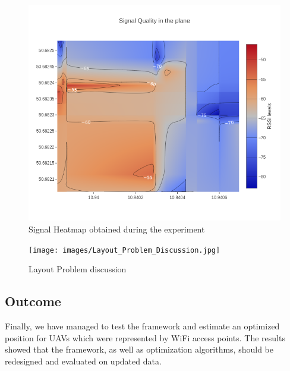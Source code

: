 \begin{figure}[H]
	\centering
	\includegraphics[width=\linewidth,keepaspectratio]{images/Exp4_Overall_Heatmap.png}
\caption{Signal Heatmap obtained during the experiment}
\end{figure}

\begin{figure}[H]
	\centering
	\texttt{[image: images/Layout\_Problem\_Discussion.jpg]}
\caption{Layout Problem discussion}
\end{figure}

\hypertarget{outcome}{%
\subsection{Outcome}\label{outcome}}

Finally, we have managed to test the framework and estimate an optimized
position for UAVs which were represented by WiFi access points. The
results showed that the framework, as well as optimization algorithms,
should be redesigned and evaluated on updated data.
